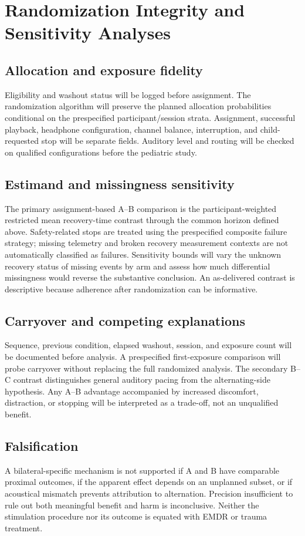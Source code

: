 \section{Randomization Integrity and Sensitivity Analyses}
\subsection{Allocation and exposure fidelity}
Eligibility and washout status will be logged before assignment. The randomization algorithm will preserve the planned allocation probabilities conditional on the prespecified participant/session strata. Assignment, successful playback, headphone configuration, channel balance, interruption, and child-requested stop will be separate fields. Auditory level and routing will be checked on qualified configurations before the pediatric study.

\subsection{Estimand and missingness sensitivity}
The primary assignment-based A--B comparison is the participant-weighted restricted mean recovery-time contrast through the common horizon defined above. Safety-related stops are treated using the prespecified composite failure strategy; missing telemetry and broken recovery measurement contexts are not automatically classified as failures. Sensitivity bounds will vary the unknown recovery status of missing events by arm and assess how much differential missingness would reverse the substantive conclusion. An as-delivered contrast is descriptive because adherence after randomization can be informative.

\subsection{Carryover and competing explanations}
Sequence, previous condition, elapsed washout, session, and exposure count will be documented before analysis. A prespecified first-exposure comparison will probe carryover without replacing the full randomized analysis. The secondary B--C contrast distinguishes general auditory pacing from the alternating-side hypothesis. Any A--B advantage accompanied by increased discomfort, distraction, or stopping will be interpreted as a trade-off, not an unqualified benefit.

\subsection{Falsification}
A bilateral-specific mechanism is not supported if A and B have comparable proximal outcomes, if the apparent effect depends on an unplanned subset, or if acoustical mismatch prevents attribution to alternation. Precision insufficient to rule out both meaningful benefit and harm is inconclusive. Neither the stimulation procedure nor its outcome is equated with EMDR or trauma treatment.